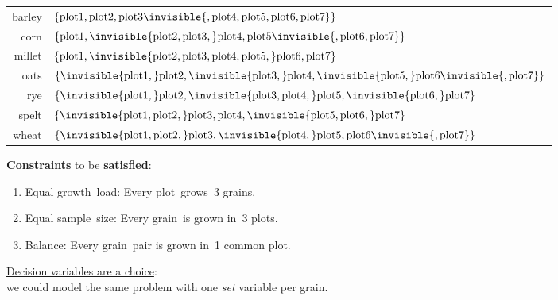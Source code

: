 \documentclass{cons-beamer}
\newcommand{\VarSem}{sample}           \newcommand{\BlkSem}{growth}
\newcommand{\Variety}{grain}           \newcommand{\Block}{\textnormal{plot}}
\newcommand{\VarBlk}{grown in}         \newcommand{\BlkVar}{grows}
\newcommand{\VarOne}{barley}           \newcommand{\BlkOne}{\Block1}
\newcommand{\VarTwo}{corn}             \newcommand{\BlkTwo}{\Block2}
\newcommand{\VarThree}{millet}         \newcommand{\BlkThree}{\Block3}
\newcommand{\VarFour}{oats}            \newcommand{\BlkFour}{\Block4}
\newcommand{\VarFive}{rye}             \newcommand{\BlkFive}{\Block5}
\newcommand{\VarSix}{spelt}            \newcommand{\BlkSix}{\Block6}
\newcommand{\VarSeven}{wheat}          \newcommand{\BlkSeven}{\Block7}
\begin{document}
\begin{frame}
  \begin{example}
    \begin{table}
      \begin{tabular}{r|l|}
        \cline{2-2}
        \VarOne   & $\Set{\BlkOne, \BlkTwo, \BlkThree \invisible{, \BlkFour, \BlkFive, \BlkSix, \BlkSeven}}$ \\ \cline{2-2}
        \VarTwo   & $\Set{\BlkOne, \invisible{\BlkTwo, \BlkThree,} \BlkFour, \BlkFive \invisible{, \BlkSix, \BlkSeven}}$ \\ \cline{2-2}
        \VarThree & $\Set{\BlkOne, \invisible{\BlkTwo, \BlkThree, \BlkFour, \BlkFive,} \BlkSix, \BlkSeven}$ \\ \cline{2-2}
        \VarFour  & $\Set{\invisible{\BlkOne,} \BlkTwo, \invisible{\BlkThree,} \BlkFour, \invisible{\BlkFive,} \BlkSix \invisible{, \BlkSeven}}$ \\ \cline{2-2}
        \VarFive  & $\Set{\invisible{\BlkOne,} \BlkTwo, \invisible{\BlkThree, \BlkFour,} \BlkFive, \invisible{\BlkSix,} \BlkSeven}$ \\ \cline{2-2}
        \VarSix   & $\Set{\invisible{\BlkOne, \BlkTwo,} \BlkThree, \BlkFour, \invisible{\BlkFive, \BlkSix,} \BlkSeven}$ \\ \cline{2-2}
        \VarSeven & $\Set{\invisible{\BlkOne, \BlkTwo,} \BlkThree, \invisible{\BlkFour,} \BlkFive, \BlkSix \invisible{, \BlkSeven}}$ \\
        \cline{2-2}
      \end{tabular}
    \end{table}
    \textbf{Constraints} to be \textbf{satisfied}:
    \begin{enumerate}
    \item Equal \BlkSem\ load: Every \Block\ \BlkVar\ 3 \Variety s.
    \item Equal \VarSem\ size: Every \Variety\ is \VarBlk\ 3 \Block s.
    \item Balance: Every \Variety\ pair is \VarBlk\ 1 common \Block.
    \end{enumerate}
  \end{example}

  \underline{Decision variables are a choice}: \\
  we could model the same problem with one \textit{set} variable per grain.
\end{frame}
\end{document}
